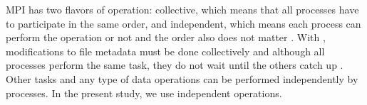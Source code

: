 MPI has two flavors of operation: collective, which means that all processes have to participate in the same order, and independent, which means each process can perform the operation or not and the order also does not matter  \cite{pythonhdf5}.
With , modifications to file metadata must be done collectively and although all processes perform the same task, they do not wait until the others catch up \cite{pythonhdf5}. 
Other tasks and any type of data operations can be performed independently by processes.
In the present study, we use independent operations.


